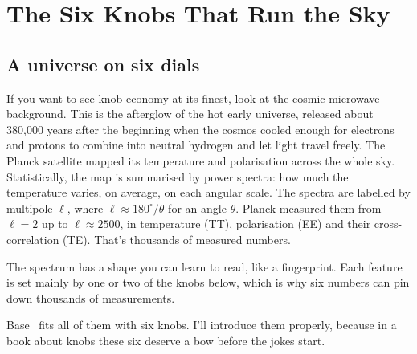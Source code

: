 \chapter{The Six Knobs That Run the Sky}




\section{A universe on six dials}

If you want to see knob economy at its finest, look at the cosmic microwave background. This is the afterglow of the hot early universe, released about 380,000 years after the beginning when the cosmos cooled enough for electrons and protons to combine into neutral hydrogen and let light travel freely. The Planck satellite mapped its temperature and polarisation across the whole sky. Statistically, the map is summarised by power spectra: how much the temperature varies, on average, on each angular scale. The spectra are labelled by multipole $\ell$, where $\ell\approx180^\circ/\theta$ for an angle $\theta$. Planck measured them from $\ell=2$ up to $\ell\approx2500$, in temperature (TT), polarisation (EE) and their cross-correlation (TE). That's thousands of measured numbers.

The spectrum has a shape you can learn to read, like a fingerprint. Each feature is set mainly by one or two of the knobs below, which is why six numbers can pin down thousands of measurements.





Base \LCDM\ fits all of them with six knobs. I'll introduce them properly, because in a book about knobs these six deserve a bow before the jokes start.

